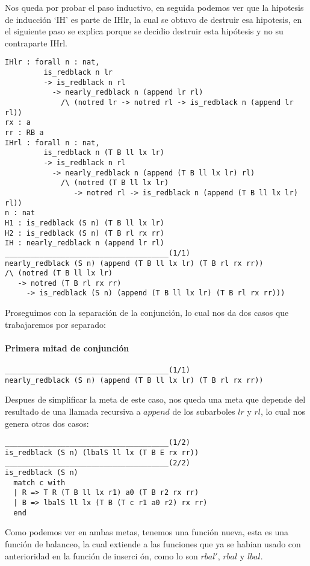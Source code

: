 Nos queda por probar el paso inductivo, en seguida podemos ver que la hipotesis de inducci\'on
`IH' es parte de IHlr, la cual se obtuvo de destruir esa hipotesis, en el siguiente paso se explica porque se decidio destruir esta hip\'otesis y no su contraparte IHrl.

\begin{verbatim}
IHlr : forall n : nat,
         is_redblack n lr
         -> is_redblack n rl
           -> nearly_redblack n (append lr rl)
             /\ (notred lr -> notred rl -> is_redblack n (append lr rl))
rx : a
rr : RB a
IHrl : forall n : nat,
         is_redblack n (T B ll lx lr)
         -> is_redblack n rl
           -> nearly_redblack n (append (T B ll lx lr) rl)
             /\ (notred (T B ll lx lr)
                -> notred rl -> is_redblack n (append (T B ll lx lr) rl))
n : nat
H1 : is_redblack (S n) (T B ll lx lr)
H2 : is_redblack (S n) (T B rl rx rr)
IH : nearly_redblack n (append lr rl)
______________________________________(1/1)
nearly_redblack (S n) (append (T B ll lx lr) (T B rl rx rr))
/\ (notred (T B ll lx lr)
   -> notred (T B rl rx rr)
     -> is_redblack (S n) (append (T B ll lx lr) (T B rl rx rr)))
\end{verbatim}

Proseguimos con la separaci\'on de la conjunci\'on, lo cual nos da dos casos que trabajaremos por
separado:

\paragraph{Primera mitad de conjunci\'on}

\begin{verbatim}
______________________________________(1/1)
nearly_redblack (S n) (append (T B ll lx lr) (T B rl rx rr))
\end{verbatim}

Despues de simplificar la meta de este caso, nos queda una meta que depende del resultado de una
llamada recursiva a $append$ de los subarboles $lr$ y $rl$, lo cual nos genera otros dos casos:

\begin{verbatim}
______________________________________(1/2)
is_redblack (S n) (lbalS ll lx (T B E rx rr))
______________________________________(2/2)
is_redblack (S n)
  match c with
  | R => T R (T B ll lx r1) a0 (T B r2 rx rr)
  | B => lbalS ll lx (T B (T c r1 a0 r2) rx rr)
  end
\end{verbatim}

Como podemos ver en ambas metas, tenemos una funci\'on nueva, esta es una funci\'on de balanceo,
la cual extiende a las funciones que ya se habian usado con anterioridad en la funci\'on de inserci
\'on, como lo son $rbal'$, $rbal$ y $lbal$.

